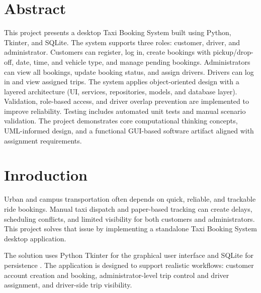 \documentclass[12pt,a4paper]{article}
\begin{document}
\newpage

\section*{Abstract}
This project presents a desktop Taxi Booking System built using Python, Tkinter, and SQLite. The system supports three roles: customer, driver, and administrator. Customers can register, log in, create bookings with pickup/drop-off, date, time, and vehicle type, and manage pending bookings. Administrators can view all bookings, update booking status, and assign drivers. Drivers can log in and view assigned trips. The system applies object-oriented design with a layered architecture (UI, services, repositories, models, and database layer). Validation, role-based access, and driver overlap prevention are implemented to improve reliability. Testing includes automated unit tests and manual scenario validation. The project demonstrates core computational thinking concepts, UML-informed design, and a functional GUI-based software artifact aligned with assignment requirements.

\newpage
\tableofcontents
\newpage
\listoffigures
\newpage
\listoftables
\newpage


\section{Inroduction}
Urban and campus transportation often depends on quick, reliable, and trackable ride bookings. Manual taxi dispatch and paper-based tracking can create delays, scheduling conflicts, and limited visibility for both customers and administrators. This project solves that issue by implementing a standalone Taxi Booking System desktop application.

The solution uses Python Tkinter for the graphical user interface and SQLite for persistence \citep{python312,tkinterdocs,sqlite}. The application is designed to support realistic workflows: customer account creation and booking, administrator-level trip control and driver assignment, and driver-side trip visibility.

\end{document}
